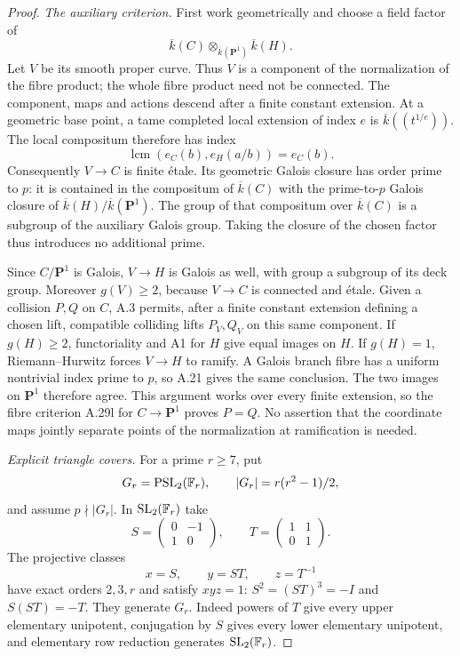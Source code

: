 \begin{proof}
\emph{The auxiliary criterion.}
First work geometrically and choose a field factor of
\[
 \overline k(C)\otimes_{\overline k(\mathbf P^1)}
                         \overline k(H).
\]
Let $V$ be its smooth proper curve. Thus $V$ is a component
of the normalization of the fibre product; the whole fibre
product need not be connected. The component, maps and
actions descend after a finite constant extension.
At a geometric base point, a tame completed local extension
of index $e$ is $\overline k((t^{1/e}))$. The local
compositum therefore has index
\[
 \operatorname{lcm}(e_C(b),e_H(a/b))=e_C(b).
\]
Consequently $V\to C$ is finite \'etale. Its geometric Galois
closure has order prime to $p$: it is contained in the
compositum of $\overline k(C)$ with the prime-to-$p$
Galois closure of $\overline k(H)/\overline k(\mathbf P^1)$.
The group of that compositum over $\overline k(C)$ is a
subgroup of the auxiliary Galois group. Taking the closure
of the chosen factor thus introduces no additional prime.

Since $C/\mathbf P^1$ is Galois, $V\to H$ is Galois as
well, with group a subgroup of its deck group. Moreover
$g(V)\ge2$, because $V\to C$ is connected and \'etale.
Given a collision $P,Q$ on $C$, A.3 permits, after a finite
constant extension defining a chosen lift, compatible
colliding lifts $P_V,Q_V$ on this same component. If
$g(H)\ge2$, functoriality and A1 for $H$ give equal images
on $H$. If $g(H)=1$, Riemann--Hurwitz forces $V\to H$
to ramify. A Galois branch fibre has a uniform nontrivial
index prime to $p$, so A.21 gives the same conclusion.
The two images on $\mathbf P^1$ therefore agree.
This argument works over every finite extension, so the
fibre criterion A.29l for $C\to\mathbf P^1$ proves $P=Q$.
No assertion that the coordinate maps jointly separate
points of the normalization at ramification is needed.

\emph{Explicit triangle covers.}
For a prime $r\ge7$, put
\[
 G_r=\operatorname{PSL}_2(\mathbb F_r),\qquad
 |G_r|=r(r^2-1)/2,
\]
and assume $p\nmid|G_r|$. In $\operatorname{SL}_2(\mathbb F_r)$
take
\[
 S=\begin{pmatrix}0&-1\\1&0\end{pmatrix},\qquad
 T=\begin{pmatrix}1&1\\0&1\end{pmatrix}.
\]
The projective classes
\[
 x=S,\qquad y=ST,\qquad z=T^{-1}
\]
have exact orders $2,3,r$ and satisfy $xyz=1$:
$S^2=(ST)^3=-I$ and $S(ST)=-T$.
They generate $G_r$. Indeed powers of $T$ give every
upper elementary unipotent, conjugation by $S$ gives
every lower elementary unipotent, and elementary row
reduction generates $\operatorname{SL}_2(\mathbb F_r)$.


\end{proof}
